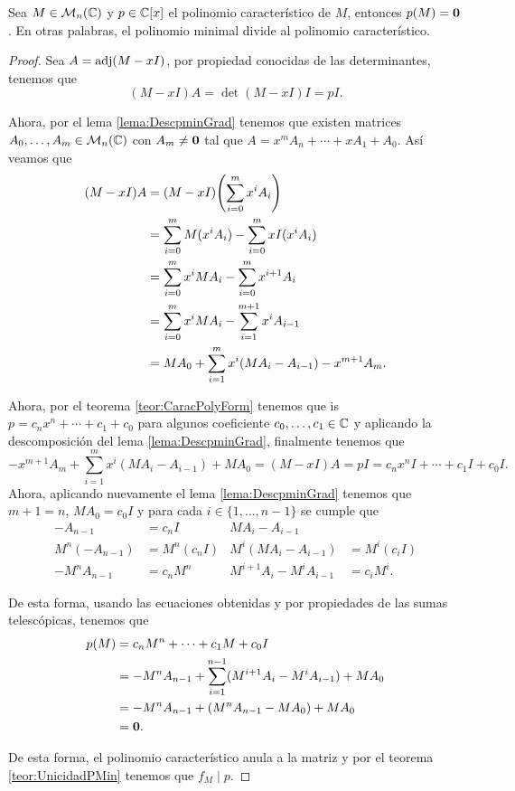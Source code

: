 \begin{teor}
  Sea $M \in \mathcal{M}_n(\mathbb{C})$ y $p \in \mathbb{C}[x]$ el polinomio característico de $M$, entonces $p(M) = \mathbf{0}$. En otras palabras, el polinomio minimal divide al polinomio característico.
\end{teor}
\begin{proof}
  Sea $A = \operatorname{adj}(M-xI)$, por propiedad conocidas de las determinantes, tenemos que
    \[ (M-xI)A = \det(M-xI) I = p I. \]
  
  Ahora, por el lema \ref{lema:DescpminGrad} tenemos que existen matrices $A_0,\ldots,A_m \in \mathcal{M}_n(\mathbb{C})$ con $A_m \neq \mathbf{0}$ tal que $A = x^m A_n + \cdots + xA_1 + A_0$. Así veamos que
  \begin{align*}
    (M-xI)A &= (M-xI) \paren{ \sum_{i=0}^m x^i A_i } \\
      &= \sum_{i=0}^m M(x^i A_i) - \sum_{i=0}^m xI(x^i A_i) \\
      &= \sum_{i=0}^m x^i M A_i  - \sum_{i=0}^m x^{i+1} A_i \\
      &= \sum_{i=0}^m x^i M A_i  - \sum_{i=1}^{m+1} x^i A_{i-1} \\
      &= MA_0 +  \sum_{i=1}^m x^i( M A_i  - A_{i-1})  - x^{m+1}A_m.
  \end{align*}

  Ahora, por el teorema \ref{teor:CaracPolyForm} tenemos que is $p = c_n x^n + \cdots + c_1 + c_0 $ para algunos coeficiente $c_0,\ldots,c_1 \in \mathbb{C}$ y aplicando la descomposición del lema \ref{lema:DescpminGrad}, finalmente tenemos que
  \[
    - x^{m+1}A_m +  \sum_{i=1}^m x^i( M A_i  - A_{i-1})  + MA_0 = (M-xI)A = pI = c_n x^n I + \cdots + c_1 I + c_0 I.
  \]
  Ahora, aplicando nuevamente el lema \ref{lema:DescpminGrad} tenemos que $m+1 = n$, $MA_0 =  c_0 I$ y para cada $i \in \{1,\ldots,n-1\}$ se cumple que
  \begin{align*}
    -A_{n-1} &= c_n I  &  M A_i  - A_{i-1}    \\
    M^n(-A_{n-1}) &= M^n(c_n I)  &  M^i(M A_i  - A_{i-1}) &= M^i(c_i I)   \\
    -M^nA_{n-1} &= c_n M^n  &  M^{i+1} A_i  - M^iA_{i-1} &= c_i M^i .
  \end{align*}

  De esta forma, usando las ecuaciones obtenidas y por propiedades de las sumas telescópicas, tenemos que
  \begin{align*}
    p(M) &= c_n M^n + \cdots + c_1M + c_0 I \\
      &= -M^nA_{n-1} + \sum_{i=1}^{n-1} (M^{i+1} A_i  - M^iA_{i-1}) + MA_0  \\
      &= -M^nA_{n-1} + (M^n A_{n-1}  - MA_0) + MA_0  \\
      &= \mathbf{0}. \\
  \end{align*}

  De esta forma, el polinomio característico anula a la matriz y por el teorema \ref{teor:UnicidadPMin} tenemos que $f_M \mid p$.
\end{proof}

